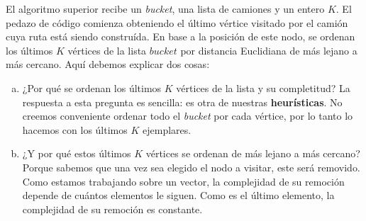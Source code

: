 El algoritmo superior recibe un \textit{bucket}, una lista de camiones y un entero $K$. El pedazo de código comienza obteniendo el último vértice visitado por el camión cuya ruta está siendo construída. En base a la posición de este nodo, se ordenan los últimos $K$ vértices de la lista $bucket$ por distancia Euclidiana de más lejano a más cercano. Aquí debemos explicar dos cosas:
\begin{enumerate}[a)]
\item ¿Por qué se ordenan los últimos $K$ vértices de la lista y su completitud? La respuesta a esta pregunta es sencilla: es otra de nuestras \textbf{heurísticas}. No creemos conveniente ordenar todo el \textit{bucket} por cada vértice, por lo tanto lo hacemos con los últimos $K$ ejemplares.
\item ¿Y por qué estos últimos $K$ vértices se ordenan de más lejano a más cercano? Porque sabemos que una vez sea elegido el nodo a visitar, este será removido. Como estamos trabajando sobre un vector, la complejidad de su remoción depende de cuántos elementos le siguen. Como es el último elemento, la complejidad de su remoción es constante.
\end{enumerate}

